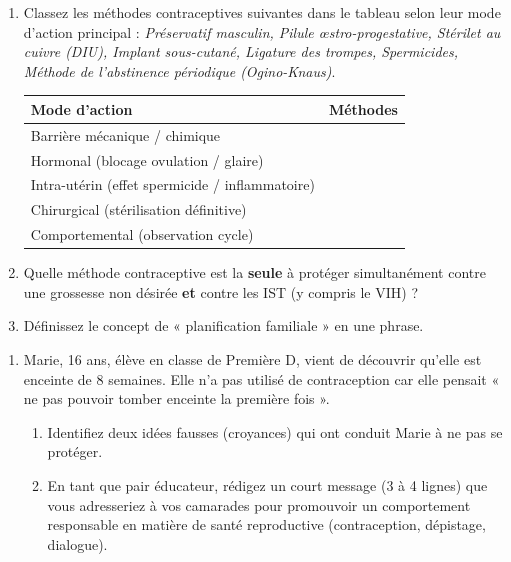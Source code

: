 \documentclass[11pt]{article}
\begin{document}
\begin{exercice}
\begin{enumerate}
    \item Classez les méthodes contraceptives suivantes dans le tableau selon leur mode d'action principal : \textit{Préservatif masculin, Pilule œstro-progestative, Stérilet au cuivre (DIU), Implant sous-cutané, Ligature des trompes, Spermicides, Méthode de l'abstinence périodique (Ogino-Knaus)}.
    \begin{tabular}{|p{5cm}|p{7cm}|}
        \hline
        \textbf{Mode d'action} & \textbf{Méthodes} \\
        \hline
        Barrière mécanique / chimique & \\
        \hline
        Hormonal (blocage ovulation / glaire) & \\
        \hline
        Intra-utérin (effet spermicide / inflammatoire) & \\
        \hline
        Chirurgical (stérilisation définitive) & \\
        \hline
        Comportemental (observation cycle) & \\
        \hline
    \end{tabular}
    \item Quelle méthode contraceptive est la \textbf{seule} à protéger simultanément contre une grossesse non désirée \textbf{et} contre les IST (y compris le VIH) ?
    \item Définissez le concept de « planification familiale » en une phrase.
\end{enumerate}
\end{exercice}

\begin{exercice}
\begin{enumerate}
    \item Marie, 16 ans, élève en classe de Première D, vient de découvrir qu'elle est enceinte de 8 semaines. Elle n'a pas utilisé de contraception car elle pensait « ne pas pouvoir tomber enceinte la première fois ». 
    \begin{enumerate}
        \item Identifiez deux idées fausses (croyances) qui ont conduit Marie à ne pas se protéger.
        \item En tant que pair éducateur, rédigez un court message (3 à 4 lignes) que vous adresseriez à vos camarades pour promouvoir un comportement responsable en matière de santé reproductive (contraception, dépistage, dialogue).
    \end{enumerate}
\end{enumerate}
\end{exercice}
\end{document}
